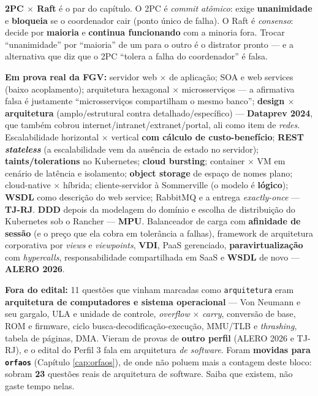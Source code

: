 \begin{pegadinha}
\textbf{2PC $\times$ Raft} é o par do capítulo. O 2PC é \emph{commit atômico}:
exige \textbf{unanimidade} e \textbf{bloqueia} se o coordenador cair (ponto
único de falha). O Raft é \emph{consenso}: decide por \textbf{maioria} e
\textbf{continua funcionando} com a minoria fora. Trocar ``unanimidade'' por
``maioria'' de um para o outro é o distrator pronto --- e a alternativa que
diz que o 2PC ``tolera a falha do coordenador'' é falsa.
\end{pegadinha}

\begin{jacaiu}
\textbf{Em prova real da FGV:} servidor web $\times$ de aplicação; SOA e web
services (baixo acoplamento); arquitetura hexagonal $\times$ microsserviços
--- a afirmativa falsa é justamente ``microsserviços compartilham o mesmo
banco''; \textbf{design $\times$ arquitetura} (amplo/estrutural contra
detalhado/específico) --- \textbf{Dataprev 2024}, que também cobrou
internet/intranet/extranet/portal, ali como item de \emph{redes}.
Escalabilidade horizontal $\times$ vertical \textbf{com cálculo de
custo-benefício}; \textbf{REST \emph{stateless}} (a escalabilidade vem da
ausência de estado no servidor); \textbf{taints/tolerations} no Kubernetes;
\textbf{cloud bursting}; container $\times$ VM em cenário de latência e
isolamento; \textbf{object storage} de espaço de nomes plano; cloud-native
$\times$ híbrida; cliente-servidor à Sommerville (o modelo é
\textbf{lógico}); \textbf{WSDL} como descrição do web service; RabbitMQ e a
entrega \emph{exactly-once} --- \textbf{TJ-RJ}. \textbf{DDD} depois da
modelagem do domínio e escolha de distribuição do Kubernetes sob o Rancher ---
\textbf{MPU}. Balanceador de carga com \textbf{afinidade de sessão} (e o preço
que ela cobra em tolerância a falhas), framework de arquitetura corporativa
por \emph{views} e \emph{viewpoints}, \textbf{VDI}, PaaS gerenciado,
\textbf{paravirtualização} com \emph{hypercalls}, responsabilidade
compartilhada em SaaS e \textbf{WSDL} de novo --- \textbf{ALERO 2026}.

\textbf{Fora do edital:} 11 questões que vinham marcadas como
\texttt{arquitetura} eram \textbf{arquitetura de computadores e sistema
operacional} --- Von Neumann e seu gargalo, ULA e unidade de controle,
\emph{overflow} $\times$ \emph{carry}, conversão de base, ROM e firmware,
ciclo busca-decodificação-execução, MMU/TLB e \emph{thrashing}, tabela de
páginas, DMA. Vieram de provas de \textbf{outro perfil} (ALERO 2026 e TJ-RJ),
e o edital do Perfil 3 fala em arquitetura \emph{de software}. Foram
\textbf{movidas para \texttt{orfaos}} (Capítulo \ref{cap:orfaos}), de onde não
poluem mais a contagem deste bloco: sobram \textbf{23} questões reais de
arquitetura de software. Saiba que existem, não gaste tempo nelas.


\end{jacaiu}
